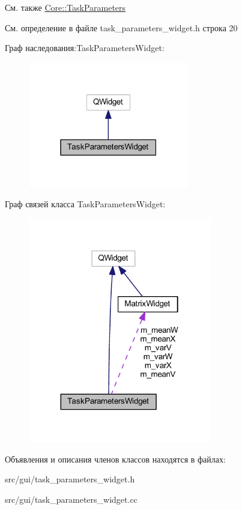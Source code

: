 \begin{DoxySeeAlso}{См. также}
\hyperlink{namespace_core_a34db09964ddb6b4af04cc94b02a49e29}{Core\+::\+Task\+Parameters} 
\end{DoxySeeAlso}


См. определение в файле task\+\_\+parameters\+\_\+widget.\+h строка 20



Граф наследования\+:Task\+Parameters\+Widget\+:\nopagebreak
\begin{figure}[H]
\begin{center}
\leavevmode
\includegraphics[width=199pt]{class_task_parameters_widget__inherit__graph}
\end{center}
\end{figure}


Граф связей класса Task\+Parameters\+Widget\+:\nopagebreak
\begin{figure}[H]
\begin{center}
\leavevmode
\includegraphics[width=227pt]{class_task_parameters_widget__coll__graph}
\end{center}
\end{figure}


Объявления и описания членов классов находятся в файлах\+:\begin{DoxyCompactItemize}
\item 
src/gui/task\+\_\+parameters\+\_\+widget.\+h\item 
src/gui/task\+\_\+parameters\+\_\+widget.\+cc\end{DoxyCompactItemize}
